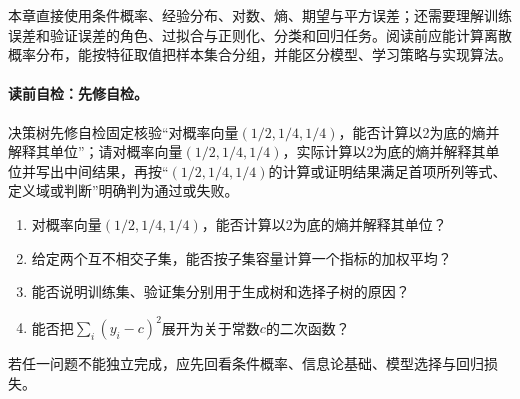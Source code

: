 
\label{struct:V2-C04-CH02}
\begin{prerequisitebox}
本章直接使用条件概率、经验分布、对数、熵、期望与平方误差；还需要理解训练误差和验证误差的角色、过拟合与正则化、分类和回归任务。阅读前应能计算离散概率分布，能按特征取值把样本集合分组，并能区分模型、学习策略与实现算法。
\end{prerequisitebox}

\label{struct:V2-C04-CH03}
\paragraph{读前自检：先修自检。}决策树先修自检固定核验“对概率向量$(1/2,1/4,1/4)$，能否计算以2为底的熵并解释其单位”；请对概率向量$(1/2,1/4,1/4)$，实际计算以2为底的熵并解释其单位并写出中间结果，再按“$(1/2,1/4,1/4)$的计算或证明结果满足首项所列等式、定义域或判断”明确判为通过或失败。\par

\begin{precheckbox}
\begin{enumerate}[leftmargin=2.2em]
  \item 对概率向量$(1/2,1/4,1/4)$，能否计算以2为底的熵并解释其单位？
  \item 给定两个互不相交子集，能否按子集容量计算一个指标的加权平均？
  \item 能否说明训练集、验证集分别用于生成树和选择子树的原因？
  \item 能否把$\sum_i(y_i-c)^2$展开为关于常数$c$的二次函数？
\end{enumerate}
若任一问题不能独立完成，应先回看条件概率、信息论基础、模型选择与回归损失。
\end{precheckbox}

